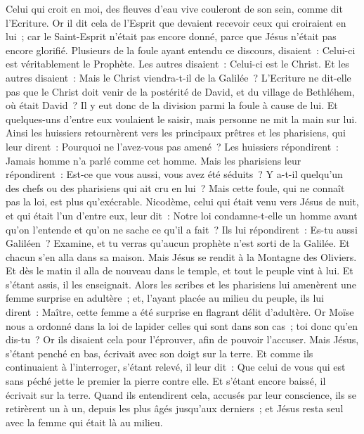 \begin{multicols}{2}
Celui qui croit en moi, des fleuves d'eau vive couleront de son sein, comme dit l'Ecriture.
Or il dit cela de l'Esprit que devaient recevoir ceux qui croiraient en lui~; car le Saint-Esprit n'était pas encore donné, parce que Jésus n'était pas encore glorifié.
Plusieurs de la foule ayant entendu ce discours, disaient~: Celui-ci est véritablement le Prophète.
Les autres disaient~: Celui-ci est le Christ. Et les autres disaient~: Mais le Christ viendra-t-il de la Galilée~?
L'Ecriture ne dit-elle pas que le Christ doit venir de la postérité de David, et du village de Bethléhem, où était David~?
Il y eut donc de la division parmi la foule à cause de lui.
Et quelques-uns d'entre eux voulaient le saisir, mais personne ne mit la main sur lui.
Ainsi les huissiers retournèrent vers les principaux prêtres et les pharisiens, qui leur dirent~: Pourquoi ne l'avez-vous pas amené~?
Les huissiers répondirent~: Jamais homme n'a parlé comme cet homme.
Mais les pharisiens leur répondirent~: Est-ce que vous aussi, vous avez été séduits~?
Y a-t-il quelqu'un des chefs ou des pharisiens qui ait cru en lui~?
Mais cette foule, qui ne connaît pas la loi, est plus qu'exécrable.
Nicodème, celui qui était venu vers Jésus de nuit, et qui était l'un d'entre eux, leur dit~:
Notre loi condamne-t-elle un homme avant qu'on l'entende et qu'on ne sache ce qu'il a fait~?
Ils lui répondirent~: Es-tu aussi Galiléen~? Examine, et tu verras qu'aucun prophète n'est sorti de la Galilée.
Et chacun s'en alla dans sa maison.
\VerseOne{}Mais Jésus se rendit à la Montagne des Oliviers.
Et dès le matin il alla de nouveau dans le temple, et tout le peuple vint à lui. Et s'étant assis, il les enseignait.
Alors les scribes et les pharisiens lui amenèrent une femme surprise en adultère~;
et, l'ayant placée au milieu du peuple, ils lui dirent~: Maître, cette femme a été surprise en flagrant délit d'adultère.
Or Moïse nous a ordonné dans la loi de lapider celles qui sont dans son cas~; toi donc qu'en dis-tu~?
Or ils disaient cela pour l'éprouver, afin de pouvoir l'accuser. Mais Jésus, s'étant penché en bas, écrivait avec son doigt sur la terre.
Et comme ils continuaient à l'interroger, s'étant relevé, il leur dit~: Que celui de vous qui est sans péché jette le premier la pierre contre elle.
Et s'étant encore baissé, il écrivait sur la terre.
Quand ils entendirent cela, accusés par leur conscience, ils se retirèrent un à un, depuis les plus âgés jusqu'aux derniers~; et Jésus resta seul avec la femme qui était là au milieu.

\end{multicols}

